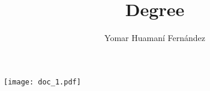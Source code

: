 \documentclass[12pt,a4paper,openany, xcolor=table]{book}
\author{Yomar Huaman\'{i} Fern\'{a}ndez}
\title{Degree}
\begin{document}
\pagestyle{plain}	
	\frontmatter
	\texttt{[image: doc\_1.pdf]}
		
		

		\tableofcontents
		
		\listoffigures
		
		\listoftables
	\cleardoublepage		
			
		

	\mainmatter
	
		
		 
		
		
	\backmatter
	
	
\end{document}
